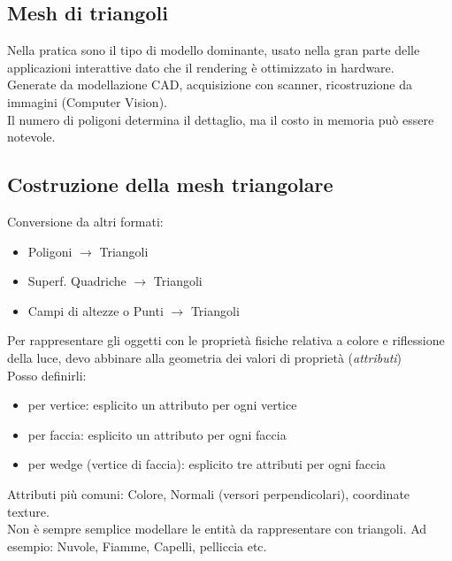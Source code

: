 \documentclass[a4paper, 10pt]{article}
\begin{document}
	\subsection{Mesh di triangoli}
		Nella pratica sono il tipo di modello dominante, usato nella gran parte delle applicazioni interattive dato che il rendering è ottimizzato in hardware.\\
		Generate da modellazione CAD, acquisizione con scanner,
		ricostruzione da immagini (Computer Vision).\\
		Il numero di poligoni determina il dettaglio, ma il costo in
		memoria può essere notevole.
		
	\subsection{Costruzione della mesh triangolare}
		Conversione da altri formati:
		\begin{itemize}
			\item Poligoni $ \longrightarrow $ Triangoli
			\item Superf. Quadriche $ \longrightarrow $ Triangoli
			\item Campi di altezze o Punti $ \longrightarrow $ Triangoli
		\end{itemize}
		Per rappresentare gli oggetti con le proprietà fisiche relativa a
		colore e riflessione della luce, devo abbinare alla geometria dei
		valori di proprietà (\textit{attributi})\\
		Posso definirli:
		\begin{itemize}
			\item per vertice: esplicito un attributo per ogni vertice
			\item per faccia: esplicito un attributo per ogni faccia
			\item per wedge (vertice di faccia): esplicito tre attributi per ogni faccia
		\end{itemize}
		Attributi più comuni: Colore, Normali (versori perpendicolari), coordinate texture.\\
		Non è sempre semplice modellare le entità da rappresentare
		con triangoli. Ad esempio: Nuvole, Fiamme, Capelli, pelliccia etc.
		
		\bigskip
		
\end{document}
